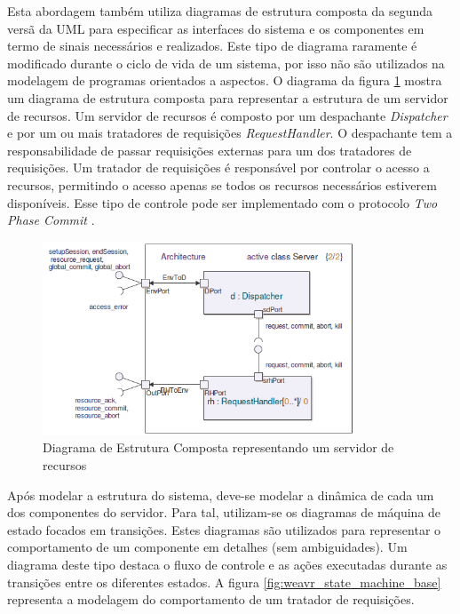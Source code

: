 Esta abordagem também utiliza diagramas de estrutura composta da segunda versã da UML para especificar as interfaces do sistema e os componentes em
termo de sinais necessários e realizados. Este tipo de diagrama raramente é modificado durante o ciclo de vida de um sistema, por isso não são
utilizados na modelagem de programas orientados a aspectos. O diagrama da figura \ref{fig:weavr_composite_structure} mostra um diagrama de estrutura
composta para representar a estrutura de um servidor de recursos. Um servidor de recursos é composto por um despachante \textit{Dispatcher} e por um
ou mais tratadores de requisições \textit{RequestHandler}. O despachante tem a responsabilidade de passar requisições externas para um dos tratadores
de requisições. Um tratador de requisições é responsável por controlar o acesso a recursos, permitindo o acesso apenas se todos os recursos
necessários estiverem disponíveis. Esse tipo de controle pode ser implementado com o protocolo \textit{Two Phase Commit} .

\begin{figure}
	\centering
	\includegraphics[width=350px]{img/weavr_composite_structure.png}
	\caption{Diagrama de Estrutura Composta
	representando um servidor de recursos}\label{fig:weavr_composite_structure}
\end{figure}

Após modelar a estrutura do sistema, deve-se modelar a dinâmica de cada um dos componentes do servidor. Para tal, utilizam-se os diagramas de
máquina de estado focados em transições. Estes diagramas são utilizados para representar o comportamento de um componente em detalhes (sem
ambiguidades). Um diagrama deste tipo destaca o fluxo de controle e as ações executadas durante as transições entre os diferentes estados. A figura
\ref{fig:weavr_state_machine_base} representa a modelagem do comportamento de um tratador de requisições.

